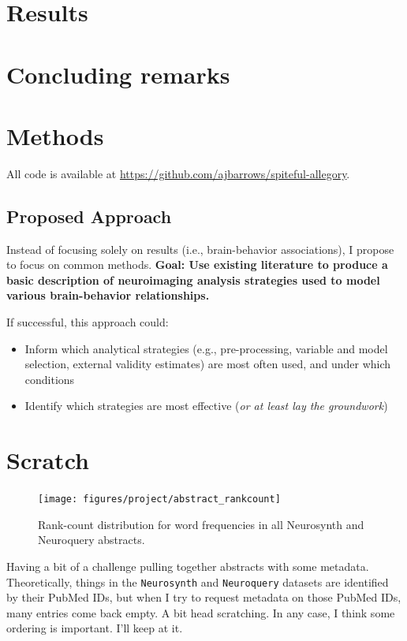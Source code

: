 \section{Results}
\label{sec:papertag.results}


\section{Concluding remarks}
\label{sec:papertag.concludingremarks}


\section{Methods}
\label{sec:papertag.methods}

All code is available at \href{https://github.com/ajbarrows/spiteful-allegory}{https://github.com/ajbarrows/spiteful-allegory}.

\subsection{Proposed Approach}

Instead of focusing solely on results (i.e., brain-behavior associations), I propose to focus on common methods. \textbf{Goal: Use existing literature to produce a basic description of neuroimaging analysis strategies used to model various brain-behavior relationships.} 

If successful, this approach could:
\begin{itemize}
	\item Inform which analytical strategies (e.g., pre-processing, variable and model selection, external validity estimates) are most often used, and under which conditions
	\item Identify which strategies are most effective (\textit{or at least lay the groundwork})
\end{itemize}




\section{Scratch}
\begin{figure}
	\texttt{[image: figures/project/abstract\_rankcount]}
	\caption{Rank-count distribution for word frequencies in all Neurosynth and Neuroquery abstracts.}
\end{figure}

Having a bit of a challenge pulling together abstracts with some metadata. Theoretically, things in the \texttt{Neurosynth} and \texttt{Neuroquery} datasets are identified by their PubMed IDs, but when I try to request metadata on those PubMed IDs, many entries come back empty. A bit head scratching. In any case, I think some ordering is important. I'll keep at it.



